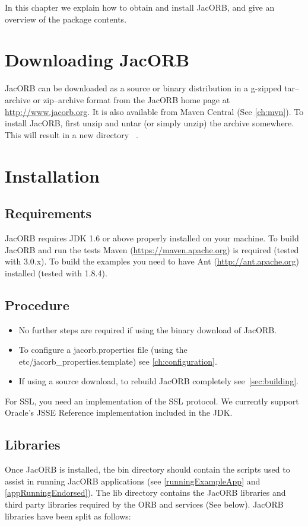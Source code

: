 
In this chapter  we explain how to obtain and  install JacORB, and give
an overview of the package contents.

\section{Downloading JacORB}

JacORB can be downloaded as a source or binary distribution in a g-zipped
tar--archive or zip--archive format from the JacORB home page at
\href{http://www.jacorb.org}{http://www.jacorb.org}. It is also available from
Maven Central (See \ref{ch:mvn}). To install JacORB, first unzip and untar (or
simply unzip) the archive somewhere.  This will result in a new directory {\tt
\JacORBDir}.

\section{Installation}
\label{Sec_installation}

\subsection{Requirements}

JacORB requires JDK 1.6 or above properly installed on your machine. To build
JacORB and run the tests Maven (\href{https://maven.apache.org}{https://maven.apache.org})
 is required (tested with 3.0.x). To build the examples you need to have Ant
(\href{http://ant.apache.org}{http://ant.apache.org}) installed (tested with 1.8.4).

\subsection{Procedure}
\begin{itemize}
\item No further steps are required if using the binary download of JacORB.
\item To configure a jacorb.properties file (using the etc/jacorb\_properties.template) see \ref{ch:configuration}.
\item If using a source download, to rebuild JacORB completely see~\ref{sec:building}.
\end{itemize}

For SSL, you need an implementation of the SSL protocol. We currently support
Oracle's JSSE Reference implementation included in the JDK.

\subsection{Libraries}
Once JacORB is installed, the bin directory should contain the scripts used to assist in
running JacORB applications (see \ref{runningExampleApp} and \ref{appRunningEndorsed}).
The lib directory contains the JacORB libraries and third party libraries required by the ORB
and services (See below). JacORB libraries have been split as follows:

